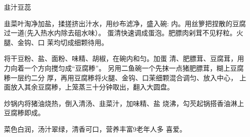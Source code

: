 \begin{recipe}{韭汁豆蕊}

\ingredients


\cooking

\step 韭菜叶淘净加盐，揉搓挤出汁水，用纱布滤净，盛入碗: 内。用丝箩把捏散的豆腐过一道(先入热水内除去砠水味）。 蛋清快速调成蛋泡。肥膘肉剁茸不见籽粒。火腿、金钩、口 茉均切成细颗待用。

\step 将干豆粉、盐、面粉、味精、胡椒，在碗内和匀。加蛋 清、肥膘茸、豆腐茸，用力向着一个方向搅匀成“豆腐糁”。 另用二鱼碗一个先抹一点猪肥膘茸，糊上豆腐糁一层约二分 厚，再用豆腐糁将火腿、金钩、口茉细颗混合调匀、放入中心， 上面放入其余豆腐糁，上笼蒸三十分钟取出，翻入大圆盘。

\step 炒锅内将猪油烧热，倒入清汤、韭菜汁，加味精、盐 烧沸，勾芡起锅搭香油淋上豆腐糁即成。

\notes

菜色白润，汤汁翠绿，清香可口，营养丰富9老年人多 喜爱。

\end{recipe}

